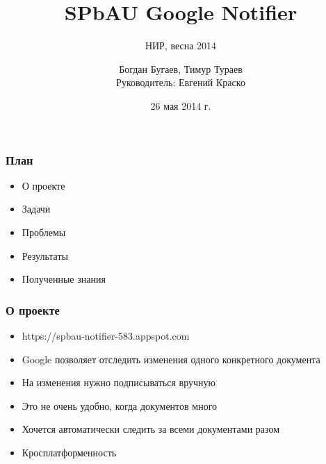 \documentclass[10pt,pdf,hyperref={unicode}]{beamer}
\begin{document}
    \title[GoogleNotifier]{SPbAU Google Notifier}
    \subtitle{НИР, весна 2014}
    \author{Богдан Бугаев, Тимур Тураев \\ Руководитель: Евгений Краско}
    \date{26 мая 2014 г.}
    

    \begin{frame}
		\titlepage
	\end{frame}

    \begin{frame}\frametitle{План}
        \begin{itemize}
        	\item О проекте
            \item Задачи
            \item Проблемы
            \item Результаты
            \item Полученные знания
        \end{itemize}
    \end{frame}
    
    \begin{frame}\frametitle{О проекте}
        \begin{itemize}
        	\item	https://spbau-notifier-583.appspot.com
            \item	Google позволяет отследить изменения одного конкретного документа
            \pause
            \item	На изменения нужно подписываться вручную
            \pause            
            \item	Это не очень удобно, когда документов много
            \pause            
            \item	Хочется автоматически следить за всеми документами разом
            \pause            
            \item	Кросплатформенность
        \end{itemize}
    \end{frame}    
\end{document}
